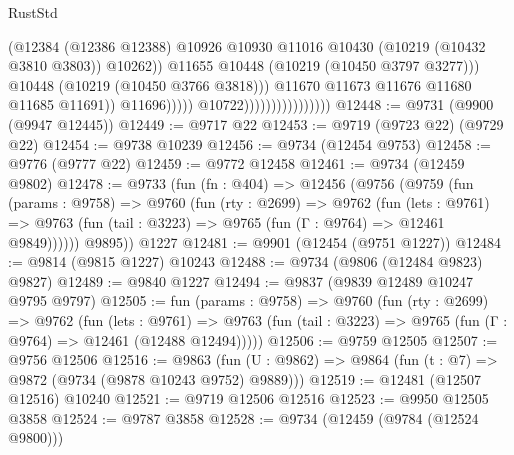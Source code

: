 \begin{lexlean}{RustStd}
\begin{coremodule}
                                                        (@12384
                                                          (@12386 @12388)
                                                          @10926
                                                          @10930
                                                          @11016
                                                          @10430
                                                          (@10219 (@10432 @3810 @3803))
                                                          @10262))
                                                      @11655
                                                      @10448
                                                      (@10219 (@10450 @3797 @3277)))
                                                    @10448
                                                    (@10219 (@10450 @3766 @3818)))
                                                  @11670
                                                  @11673
                                                  @11676
                                                  @11680
                                                  @11685
                                                  @11691))
                                              @11696)))))
                                    @10722))))))))))))))))
@12448 := @9731 (@9900 (@9947 @12445))
@12449 := @9717 @22
@12453 := @9719 (@9723 @22) (@9729 @22)
@12454 := @9738 @10239
@12456 := @9734 (@12454 @9753)
@12458 := @9776 (@9777 @22)
@12459 := @9772 @12458
@12461 := @9734 (@12459 @9802)
@12478 := @9733
    (fun (fn : @404) =>
    @12456
      (@9756
        (@9759
          (fun (params : @9758) =>
          @9760
            (fun (rty : @2699) =>
            @9762
              (fun (lets : @9761) =>
              @9763 (fun (tail : @3223) => @9765 (fun (Γ : @9764) => @12461 @9849))))))
        @9895))
    @1227
@12481 := @9901 (@12454 (@9751 @1227))
@12484 := @9814 (@9815 @1227) @10243
@12488 := @9734 (@9806 (@12484 @9823) @9827)
@12489 := @9840 @1227
@12494 := @9837 (@9839 @12489 @10247 @9795 @9797)
@12505 := fun (params : @9758) =>
  @9760
    (fun (rty : @2699) =>
    @9762
      (fun (lets : @9761) =>
      @9763 (fun (tail : @3223) => @9765 (fun (Γ : @9764) => @12461 (@12488 @12494)))))
@12506 := @9759 @12505
@12507 := @9756 @12506
@12516 := @9863
    (fun (U : @9862) => @9864 (fun (t : @7) => @9872 (@9734 (@9878 @10243 @9752) @9889)))
@12519 := @12481 (@12507 @12516) @10240
@12521 := @9719 @12506 @12516
@12523 := @9950 @12505 @3858
@12524 := @9787 @3858
@12528 := @9734 (@12459 (@9784 (@12524 @9800)))

\end{coremodule}
\end{lexlean}
